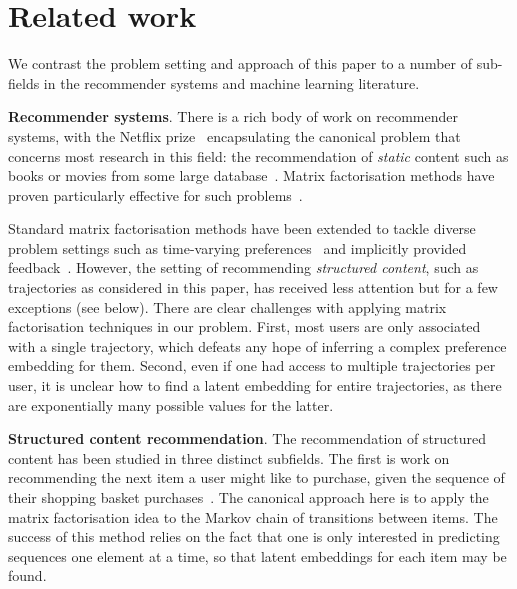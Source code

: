 
\secmoveup
\section{Related work}
\label{sec:related}
\textmoveup

We contrast the problem setting and approach of this paper to a number of sub-fields in the recommender systems and machine learning literature.


\textbf{Recommender systems}.
There is a rich body of work on recommender systems,
with the
Netflix prize~\citep{Netflix} encapsulating the canonical problem that concerns most research in this field:
the recommendation of \emph{static} content such as books or movies from some large database~\citep{Goldberg:1992,Sarwar:2001}.
Matrix factorisation methods have proven particularly effective for such problems~\citep{Koren:2009}.

Standard matrix factorisation methods
have been extended to tackle
diverse problem settings such as
time-varying preferences~\citep{Koren:2009b} and implicitly provided feedback~\citep{Rendle:2009}.
However,
the setting of recommending \emph{structured content},
such as trajectories as considered in this paper,
has received less attention but for a few exceptions (see below).
There are clear challenges with applying matrix factorisation techniques in our problem.
First, most users are only associated with a single trajectory, which defeats any hope of inferring a complex preference embedding for them.
Second, even if one had access to multiple trajectories per user, it is unclear how to find a latent embedding for entire trajectories,
as there are exponentially many possible values for the latter.



\textbf{Structured content recommendation}.
The recommendation of structured content has
been studied in three distinct subfields.
The first is work on recommending the next item a user might like to purchase, given the sequence of their shopping basket purchases~\citep{Rendle:2010,Wang:2015}.
The canonical approach here is to apply the matrix factorisation idea to the Markov chain of transitions between items.
The success of this method relies on the fact that one is only interested in predicting sequences one element at a time, so that latent embeddings for each item may be found.


